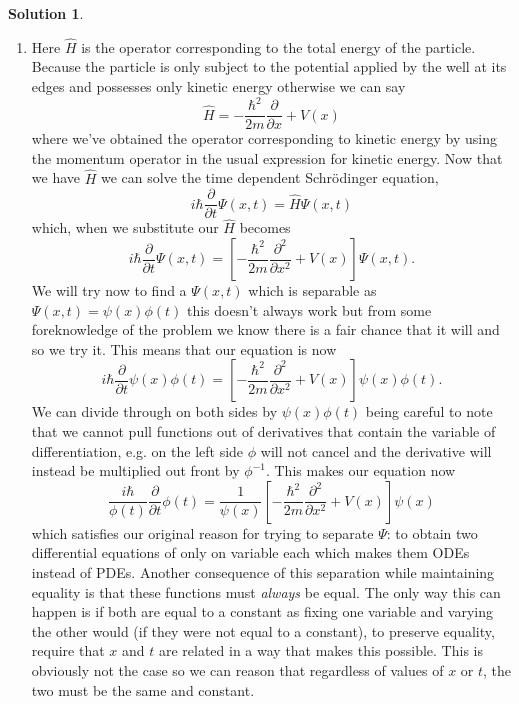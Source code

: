 \documentclass[10pt]{article}
\theoremstyle{definition}
\newtheorem{soln}{Solution}
\begin{document}
\begin{soln}~
  \begin{enumerate}[label=(\alph*)]
    \item Here $\hat{H}$ is the operator corresponding to the total energy of the particle. Because the particle is only subject to the potential
          applied by the well at its edges and possesses only kinetic energy otherwise we can say
          $$\hat{H}=-\frac{\hbar^2}{2m}\frac{\partial}{\partial x} + V(x)$$
          where we've obtained the operator corresponding to kinetic energy by using the momentum operator in the usual expression for kinetic energy.
          Now that we have $\hat{H}$ we can solve the time dependent Schr\"odinger equation,
          $$i\hbar\frac{\partial}{\partial t}\Psi(x,t)=\hat{H}\Psi(x,t)$$
          which, when we substitute our $\hat{H}$ becomes
          $$i\hbar\frac{\partial}{\partial t}\Psi(x,t)=\left[-\frac{\hbar^2}{2m}\frac{\partial^2}{\partial x^2} + V(x)\right]\Psi(x,t).$$
          We will try now to find a $\Psi(x,t)$ which is separable as $\Psi(x,t)=\psi(x)\phi(t)$ this doesn't always work but from some foreknowledge
          of the problem we know there is a fair chance that it will and so we try it. This means that our equation is now
          $$i\hbar\frac{\partial}{\partial t}\psi(x)\phi(t)=\left[-\frac{\hbar^2}{2m}\frac{\partial^2}{\partial x^2}  + V(x)\right]\psi(x)\phi(t).$$
          We can divide through on both sides by $\psi(x)\phi(t)$ being careful to note that we cannot pull functions out of derivatives that contain
          the variable of differentiation, e.g. on the left side $\phi$ will not cancel and the derivative will instead be multiplied out front
          by $\phi^{-1}$. This makes our equation now
          $$\frac{i\hbar}{\phi(t)}\frac{\partial}{\partial t}\phi(t)=\frac{1}{\psi(x)}\left[-\frac{\hbar^2}{2m}\frac{\partial^2}{\partial x^2}  + V(x)\right]\psi(x)$$
          which satisfies our original reason for trying to separate $\Psi$: to obtain two differential equations of only on variable each which makes them ODEs instead
          of PDEs. Another consequence of this separation while maintaining equality is that these functions must \emph{always} be equal. The only way this can happen
          is if both are equal to a constant as fixing one variable and varying the other would (if they were not equal to a constant), to preserve equality, require that $x$ and $t$
          are related in a way that makes this possible. This is obviously not the case so we can reason that regardless of values of $x$ or $t$, the two must be the same and constant.

\end{enumerate}
\end{soln}
\end{document}
